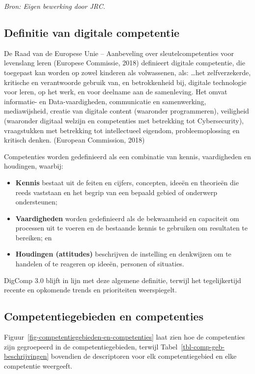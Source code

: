 \documentclass[
  dutch,
  letterpaper,
  DIV=11,
  numbers=noendperiod]{scrartcl}
\begin{document}
\emph{Bron: Eigen bewerking door JRC.}

\subsection{Definitie van digitale
competentie}\label{sec-definitie-van-digitale-competentie}

De Raad van de Europese Unie -- Aanbeveling over sleutelcompetenties
voor levenslang leren (Europese Commissie, 2018) definieert digitale
competentie, die toegepast kan worden op zowel kinderen als volwassenen,
als: \ldots het zelfverzekerde, kritische en verantwoorde gebruik van,
en betrokkenheid bij, digitale technologie voor leren, op het werk, en
voor deelname aan de samenleving. Het omvat informatie- en
Data-vaardigheden, communicatie en samenwerking, mediawijsheid, creatie
van digitale content (waaronder programmeren), veiligheid (waaronder
digitaal welzijn en competenties met betrekking tot Cybersecurity),
vraagstukken met betrekking tot intellectueel eigendom,
probleemoplossing en kritisch denken. (European Commission, 2018)

Competenties worden gedefinieerd als een combinatie van kennis,
vaardigheden en houdingen, waarbij:

\begin{itemize}
\item
  \textbf{Kennis} bestaat uit de feiten en cijfers, concepten, ideeën en
  theorieën die reeds vaststaan en het begrip van een bepaald gebied of
  onderwerp ondersteunen;
\item
  \textbf{Vaardigheden} worden gedefinieerd als de bekwaamheid en
  capaciteit om processen uit te voeren en de bestaande kennis te
  gebruiken om resultaten te bereiken; en
\item
  \textbf{Houdingen (attitudes)} beschrijven de instelling en denkwijzen
  om te handelen of te reageren op ideeën, personen of situaties.
\end{itemize}

DigComp 3.0 blijft in lijn met deze algemene definitie, terwijl het
tegelijkertijd recente en opkomende trends en prioriteiten weerspiegelt.

\subsection{Competentiegebieden en
competenties}\label{sec-competentiegebieden-en-competenties}

Figuur~\ref{fig-competentiegebieden-en-competenties} laat zien hoe de
competenties zijn gegroepeerd in de competentiegebieden, terwijl
Tabel~\ref{tbl-comp-geb-beschrijvingen} bovendien de descriptoren voor
elk competentiegebied en elke competentie weergeeft.
\end{document}
